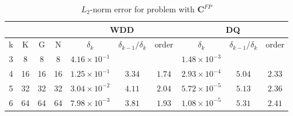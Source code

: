 \documentclass[../main.tex]{subfiles}
\begin{document}
\begin{table}[!htb]
  \centering
  \caption{$L_2$-norm error for problem with $\boldsymbol{C}^{FP}$}
  \label{tab:L2_fokker_planck}
  \begin{tabular}{cccc|ccc|ccc}
  \toprule[2pt]
  \multicolumn{4}{c|}{} & \multicolumn{3}{c|}{WDD} & \multicolumn{3}{c}{DQ} \\ \hline
  \multicolumn{1}{c}{k} & \multicolumn{1}{c}{K}  & \multicolumn{1}{c}{G}  & \multicolumn{1}{c|}{N}  
  & \multicolumn{1}{c}{$\delta_k$} & \multicolumn{1}{c}{$\delta_{k-1} / \delta_k$} & \multicolumn{1}{c|}{order}    
  & \multicolumn{1}{c}{$\delta_k$} & \multicolumn{1}{c}{$\delta_{k-1} / \delta_k$} & \multicolumn{1}{c}{order}
  \\ \midrule[2pt]
  \multicolumn{1}{c}{3} & \multicolumn{1}{c}{8}  & \multicolumn{1}{c}{8}  & \multicolumn{1}{c|}{8}  
  & \multicolumn{1}{c}{$4.16\times 10^{-1}$}  & \multicolumn{1}{c}{} & \multicolumn{1}{c|}{}         
  & \multicolumn{1}{c}{$1.48\times 10^{-3}$}  & \multicolumn{1}{c}{} & \multicolumn{1}{c}{} \\
  \multicolumn{1}{c}{4} & \multicolumn{1}{c}{16} & \multicolumn{1}{c}{16} & \multicolumn{1}{c|}{16} 
  & \multicolumn{1}{c}{$1.25\times 10^{-1}$} & \multicolumn{1}{c}{$3.34$} & \multicolumn{1}{c|}{$1.74$} 
  & \multicolumn{1}{c}{$2.93\times 10^{-4}$} & \multicolumn{1}{c}{$5.04$} & \multicolumn{1}{c}{$2.33$} \\
  \multicolumn{1}{c}{5} & \multicolumn{1}{c}{32} & \multicolumn{1}{c}{32} & \multicolumn{1}{c|}{32} 
  & \multicolumn{1}{c}{$3.04\times 10^{-2}$} & \multicolumn{1}{c}{$4.11$} & \multicolumn{1}{c|}{$2.04$} 
  & \multicolumn{1}{c}{$5.72\times 10^{-5}$} & \multicolumn{1}{c}{$5.13$} & \multicolumn{1}{c}{$2.36$} \\
  \multicolumn{1}{c}{6} & \multicolumn{1}{c}{64} & \multicolumn{1}{c}{64} & \multicolumn{1}{c|}{64} 
  & \multicolumn{1}{c}{$7.98\times 10^{-3}$} & \multicolumn{1}{c}{$3.81$} & \multicolumn{1}{c|}{$1.93$} 
  & \multicolumn{1}{c}{$1.08\times 10^{-5}$} & \multicolumn{1}{c}{$5.31$} & \multicolumn{1}{c}{$2.41$} \\
  \bottomrule[2pt]
  \end{tabular}
\end{table}
\end{document}
